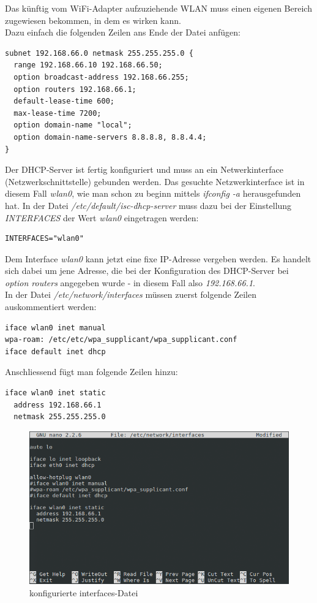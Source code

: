 Das künftig vom WiFi-Adapter aufzuziehende WLAN muss einen eigenen Bereich zugewiesen bekommen, in dem es wirken kann.
\\
Dazu einfach die folgenden Zeilen ans Ende der Datei anfügen:

\begin{lstlisting}
subnet 192.168.66.0 netmask 255.255.255.0 {
  range 192.168.66.10 192.168.66.50;
  option broadcast-address 192.168.66.255;
  option routers 192.168.66.1;
  default-lease-time 600;
  max-lease-time 7200;
  option domain-name "local";
  option domain-name-servers 8.8.8.8, 8.8.4.4;
}
\end{lstlisting}

Der DHCP-Server ist fertig konfiguriert und muss an ein Netwerkinterface (Netzwerkschnittstelle) gebunden werden. Das gesuchte Netzwerkinterface ist in diesem Fall \textit{wlan0}, wie man schon zu beginn mittels \textit{ifconfig -a} herausgefunden hat.
In der Datei \textit{/etc/default/isc-dhcp-server} muss dazu bei der Einstellung \textit{INTERFACES} der Wert \textit{wlan0} eingetragen werden:

\begin{lstlisting}
INTERFACES="wlan0"
\end{lstlisting}

Dem Interface \textit{wlan0} kann jetzt eine fixe IP-Adresse vergeben werden. Es handelt sich dabei um jene Adresse, die bei der Konfiguration des DHCP-Server bei \textit{option routers} angegeben wurde - in diesem Fall also \textit{192.168.66.1}. 
\\
In der Datei \textit{/etc/network/interfaces} müssen zuerst folgende Zeilen auskommentiert werden:

\begin{lstlisting}
iface wlan0 inet manual
wpa-roam: /etc/etc/wpa_supplicant/wpa_supplicant.conf
iface default inet dhcp
\end{lstlisting}

Anschliessend fügt man folgende Zeilen hinzu:

\begin{lstlisting}
iface wlan0 inet static
  address 192.168.66.1
  netmask 255.255.255.0
\end{lstlisting}

\begin{figure}[H]
\centering
\includegraphics[scale=0.7]{images/network_interfaces}
\caption{konfigurierte interfaces-Datei}
\end{figure}


